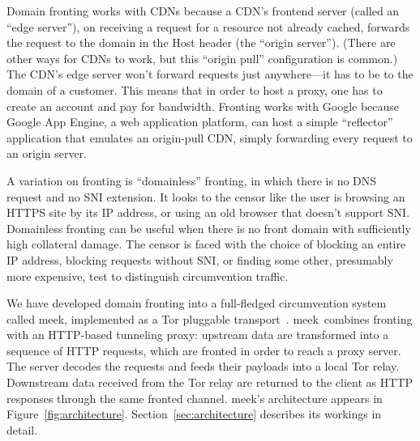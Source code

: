 \documentclass[conference]{IEEEtran}
\def\meek{meek}
\begin{document}
Domain fronting works with CDNs because a CDN's frontend server
(called an ``edge server''),
on receiving a request for a resource not already cached,
forwards the request to the domain in the Host header
(the ``origin server'').
(There are other ways for CDNs to work, but this ``origin pull''
configuration is common.)
The CDN's edge server won't forward requests just anywhere---it
has to be to the domain of a customer.
This means that in order to host a proxy,
one has to create an account and pay for bandwidth.
Fronting works with Google because Google App Engine, a web application platform,
can host a simple ``reflector'' application that emulates
an origin-pull CDN, simply forwarding every request to an origin server.

A variation on fronting is ``domainless'' fronting,
in which there is no DNS request and no SNI extension.
It looks to the censor
like the user is browsing an HTTPS site by its IP address,
or using an old browser that doesn't support SNI.
Domainless fronting can be useful when there is no front domain
with sufficiently high collateral damage.
The censor is faced with the choice of blocking an entire IP address,
blocking requests without SNI,
or finding some other, presumably more expensive, test to distinguish
circumvention traffic.

We have developed domain fronting into a full-fledged circumvention system called \meek,
implemented as a Tor pluggable transport~\cite{pt}.
\meek\ combines fronting with an HTTP-based tunneling proxy:
upstream data are transformed into a sequence of HTTP requests,
which are fronted in order to reach a proxy server.
The server decodes the requests and feeds their payloads
into a local Tor relay.
Downstream data received from the Tor relay
are returned to the client as HTTP responses
through the same fronted channel.
\meek's architecture appears in Figure~\ref{fig:architecture}.
Section~\ref{sec:architecture} describes its workings in detail.
\end{document}
